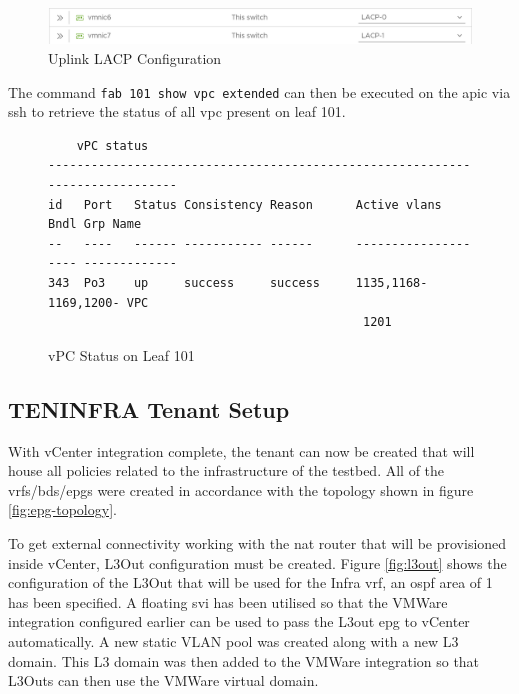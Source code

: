 \begin{figure}[H]

    \centering
    \includegraphics[scale=0.7]{images/lacp-interface-assignment.png}

    \caption{Uplink LACP Configuration}
    \label{fig:uplink-lacp}
\end{figure}
The command \verb|fab 101 show vpc extended| can then be executed on the \gls{apic} via \gls{ssh} to retrieve the status of all \gls{vpc} present on leaf 101.
\begin{figure}[H]
\begin{small}
    \begin{verbatim}
    vPC status
-----------------------------------------------------------------------------
id   Port   Status Consistency Reason      Active vlans         Bndl Grp Name
--   ----   ------ ----------- ------      -------------------- -------------
343  Po3    up     success     success     1135,1168-1169,1200- VPC
                                            1201

    \end{verbatim}
\end{small}
\caption{vPC Status on Leaf 101}
\label{fig:vpc-status}
\end{figure}


\subsection{TEN\textunderscore INFRA Tenant Setup}
With vCenter integration complete, the tenant can now be created that will house all policies related to the infrastructure of the testbed. All of the \gls{vrf}s/\gls{bd}s/\gls{epg}s were created in accordance with the topology shown in figure \ref{fig:epg-topology}.

To get external connectivity working with the \gls{nat} router that will be provisioned inside vCenter, L3Out configuration must be created. Figure \ref{fig:l3out} shows the configuration of the L3Out that will be used for the Infra \gls{vrf}, an \gls{ospf} area of 1 has been specified. A floating \gls{svi} has been utilised so that the VMWare integration configured earlier can be used to pass the L3out \gls{epg} to vCenter automatically. A new static VLAN pool was created along with a new L3 domain. This L3 domain was then added to the VMWare integration so that L3Outs can then use the VMWare virtual domain.

